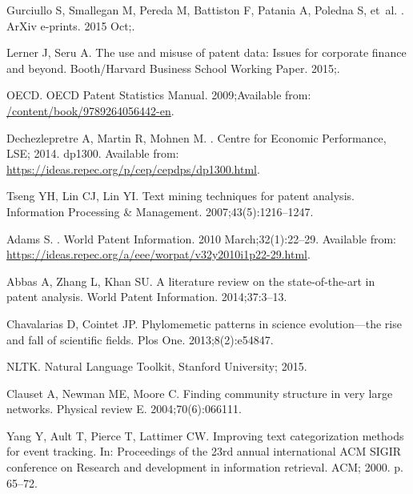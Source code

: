 \documentclass[10pt,A4,draft]{article}
\begin{document}
\begin{thebibliography}{10}
{Gurciullo} S, {Smallegan} M, {Pereda} M, {Battiston} F, {Patania} A, {Poledna}
  S, et~al.
.
\newblock ArXiv e-prints. 2015 Oct;.

Lerner J, Seru A.
\newblock The use and misuse of patent data: Issues for corporate finance and
  beyond.
\newblock Booth/Harvard Business School Working Paper. 2015;.

OECD.
\newblock OECD Patent Statistics Manual. 2009;Available from:
  \url{/content/book/9789264056442-en}.

Dechezlepretre A, Martin R, Mohnen M.
.
\newblock Centre for Economic Performance, LSE; 2014. dp1300.
\newblock Available from:
  \url{https://ideas.repec.org/p/cep/cepdps/dp1300.html}.

Tseng YH, Lin CJ, Lin YI.
\newblock Text mining techniques for patent analysis.
\newblock Information Processing \& Management. 2007;43(5):1216--1247.

Adams S.
.
\newblock World Patent Information. 2010 March;32(1):22--29.
\newblock Available from:
  \url{https://ideas.repec.org/a/eee/worpat/v32y2010i1p22-29.html}.

Abbas A, Zhang L, Khan SU.
\newblock A literature review on the state-of-the-art in patent analysis.
\newblock World Patent Information. 2014;37:3--13.

Chavalarias D, Cointet JP.
\newblock Phylomemetic patterns in science evolution---the rise and fall of
  scientific fields.
\newblock Plos One. 2013;8(2):e54847.

NLTK. Natural Language Toolkit, Stanford University; 2015.

Clauset A, Newman ME, Moore C.
\newblock Finding community structure in very large networks.
\newblock Physical review E. 2004;70(6):066111.

Yang Y, Ault T, Pierce T, Lattimer CW.
\newblock Improving text categorization methods for event tracking.
\newblock In: Proceedings of the 23rd annual international ACM SIGIR conference
  on Research and development in information retrieval. ACM; 2000. p. 65--72.


\end{thebibliography}
\end{document}
